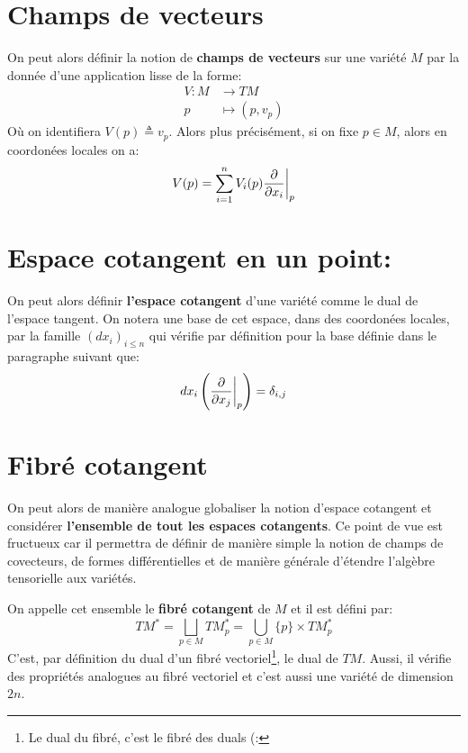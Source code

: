 \section{Champs de vecteurs}
On peut alors définir la notion de \textbf{champs de vecteurs} sur une variété \( M \) par la donnée d'une application lisse de la forme:
\[ 
   \begin{aligned}
      V : M &\longrightarrow TM \\
      p &\longmapsto (p, v_p)
   \end{aligned} 
\]
Où on identifiera \( V(p) \triangleq v_p \). Alors plus précisément, si on fixe \( p \in M \), alors en coordonées locales on a:
\[ 
   V(p) = \sum_{i = 1}^n V_i(p) \frac{\partial }{\partial x_i}\biggr|_p
\]
\pagebreak

\section{Espace cotangent en un point:}
On peut alors définir \textbf{l'espace cotangent} d'une variété comme le dual de l'espace tangent. On notera une base de cet espace, dans des coordonées locales, par la famille \( (dx_i)_{i \leq n} \) qui vérifie par définition pour la base définie dans le paragraphe suivant que:
\[ 
   dx_i\left(\frac{\partial }{\partial x_j}\biggr|_p\right) = \delta_{i, j}
\]
\section{Fibré cotangent}
On peut alors de manière analogue globaliser la notion d'espace cotangent et considérer \textbf{l'ensemble de tout les espaces cotangents}. Ce point de vue est fructueux car il permettra de définir de manière simple la notion de champs de covecteurs, de formes différentielles et de manière générale d'étendre l'algèbre tensorielle aux variétés.\< 

On appelle cet ensemble le \textbf{fibré cotangent} de \( M \) et il est défini par:
\[ 
   TM^* = \bigsqcup_{p \in M} TM^*_p = \bigcup_{p \in M} \{p\} \times TM^*_p
\]
C'est, par définition du dual d'un fibré vectoriel\footnote[1]{Le dual du fibré, c'est le fibré des duals (:}, le dual de \( TM \). Aussi, il vérifie des propriétés analogues au fibré vectoriel et c'est aussi une variété de dimension \( 2n \).
